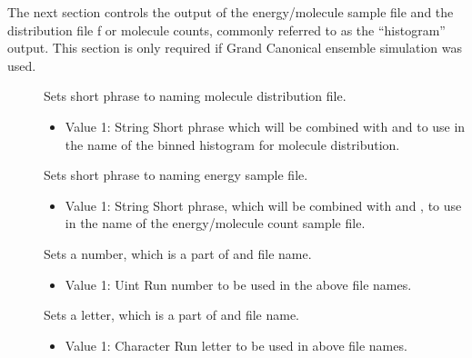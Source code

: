 \documentclass[letterpaper,10pt,english]{sphinxmanual}
\begin{document}
\sphinxAtStartPar
The next section controls the output of the energy/molecule sample file and the distribution file f
or molecule counts, commonly referred to as the “histogram” output. This section is only required
if Grand Canonical ensemble simulation was used.
\begin{description}
\item[{}] \leavevmode
\sphinxAtStartPar
Sets short phrase to naming molecule distribution file.
\begin{itemize}
\item {} 
\sphinxAtStartPar
Value 1: String \sphinxhyphen{} Short phrase which will be combined with  and  to use in the name of the binned histogram for molecule distribution.

\end{itemize}

\item[{}] \leavevmode
\sphinxAtStartPar
Sets short phrase to naming energy sample file.
\begin{itemize}
\item {} 
\sphinxAtStartPar
Value 1: String \sphinxhyphen{} Short phrase, which will be combined with  and , to use in the name of the energy/molecule count sample file.

\end{itemize}

\item[{}] \leavevmode
\sphinxAtStartPar
Sets a number, which is a part of  and  file name.
\begin{itemize}
\item {} 
\sphinxAtStartPar
Value 1: Uint \textendash{} Run number to be used in the above file names.

\end{itemize}

\item[{}] \leavevmode
\sphinxAtStartPar
Sets a letter, which is a part of  and  file name.
\begin{itemize}
\item {} 
\sphinxAtStartPar
Value 1: Character \textendash{} Run letter to be used in above file names.


\end{itemize}
\end{description}
\end{document}

